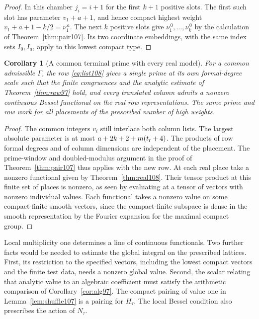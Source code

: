 \documentclass[a4paper,11pt]{article}
\newtheorem{corollary}[proposition]{Corollary}
\theoremstyle{definition}
\theoremstyle{remark}
\numberwithin{equation}{section}
\begin{document}
\begin{proof}
In this chamber \(j_i=i+1\) for the first \(k+1\) positive
slots. The first such slot has parameter \(v_1+a+1\), and hence
compact highest weight \(v_1+a+1-k/2=\nu_1^{\,a}\). The next
\(k\) positive slots give \(\nu^{\,0}_1,\ldots,\nu^{\,0}_k\)
by the calculation of Theorem~\ref{thm:pair107}. Its two
coordinate embeddings, with the same index sets \(I_0,I_a\),
apply to this lowest compact type.
\end{proof}

\begin{corollary}[A common terminal prime with every real model]\label{cor:realplace108}
For a common admissible \(\Gamma\), the row \eqref{eq:list108}
gives a single prime at its own formal-degree scale such that
the finite congruences and the analytic estimate of
Theorem~\ref{thm:raw97} hold, and every translated column admits
a nonzero continuous Bessel functional on the real row
representations. The same prime and row work for all placements
of the prescribed number of high weights.
\end{corollary}
\begin{proof}
The common integers \(v_i\) still interlace both column lists.
The largest absolute parameter is at most
\(a+2k+2+m(t_{\rm r}+4)\). The products of row formal degrees
and of column dimensions are independent of the placement.
The prime-window and doubled-modulus argument in the proof of
Theorem~\ref{thm:pair107} thus applies with the new row. At each
real place take a nonzero functional given by
Theorem~\ref{thm:real108}. Their tensor product at this finite
set of places is nonzero, as seen by evaluating at a tensor of
vectors with nonzero individual values. Each functional takes
a nonzero value on some compact-finite smooth vectors, since
the compact-finite subspace is dense in the smooth representation
by the Fourier expansion for the maximal compact group.
\end{proof}

Local multiplicity one determines a line of continuous
functionals. Two further facts would be needed to estimate the
global integral on the prescribed lattices. First, its restriction
to the specified vectors, including the lowest compact vectors
and the finite test data, needs a nonzero global value. Second,
the scalar relating that analytic value to an algebraic coefficient
must satisfy the arithmetic comparison of Corollary~\ref{cor:alg97}.
The compact pairing of value one in Lemma~\ref{lem:shuffle107}
is a pairing for \(H_\tau\). The local Bessel condition also
prescribes the action of \(N_\tau\).
\end{document}
